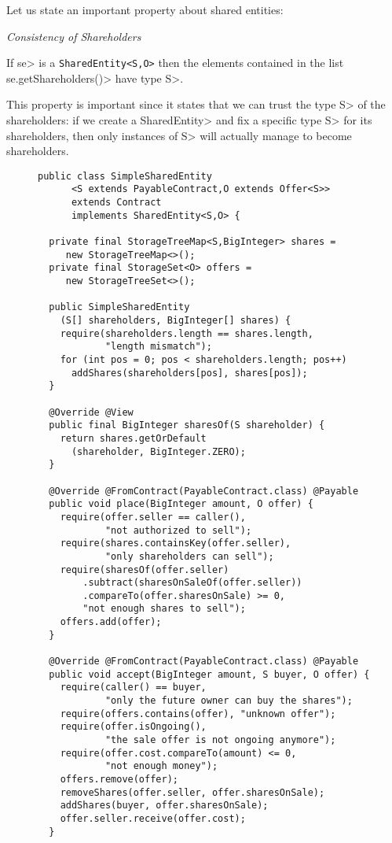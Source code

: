 Let us state an important property about shared entities:

\begin{tcolorbox}
  \begin{center}\emph{Consistency of Shareholders}\end{center}
  If \<se> is a {\codesize\texttt{SharedEntity<S,O>}}
  then the elements contained in the list \<se.getShareholders()> have type \<S>.
\end{tcolorbox}

\noindent
This property is important since it states that we can trust the type \<S> of
the shareholders: if we create a \<SharedEntity> and fix a specific type \<S>
for its shareholders, then only instances of \<S> will actually manage to become shareholders.

\begin{figure}[htbp]
  \begin{center}
    \begin{lstlisting}[language=Takamaka]
public class SimpleSharedEntity
      <S extends PayableContract,O extends Offer<S>>
      extends Contract
      implements SharedEntity<S,O> {

  private final StorageTreeMap<S,BigInteger> shares = 
     new StorageTreeMap<>();
  private final StorageSet<O> offers = 
     new StorageTreeSet<>();        

  public SimpleSharedEntity
    (S[] shareholders, BigInteger[] shares) {
    require(shareholders.length == shares.length, 
            "length mismatch");
    for (int pos = 0; pos < shareholders.length; pos++)
      addShares(shareholders[pos], shares[pos]);
  }

  @Override @View
  public final BigInteger sharesOf(S shareholder) {
    return shares.getOrDefault
      (shareholder, BigInteger.ZERO);
  }

  @Override @FromContract(PayableContract.class) @Payable
  public void place(BigInteger amount, O offer) {
    require(offer.seller == caller(), 
            "not authorized to sell");
    require(shares.containsKey(offer.seller), 
            "only shareholders can sell");
    require(sharesOf(offer.seller)
        .subtract(sharesOnSaleOf(offer.seller))
        .compareTo(offer.sharesOnSale) >= 0, 
        "not enough shares to sell");
    offers.add(offer);
  }

  @Override @FromContract(PayableContract.class) @Payable
  public void accept(BigInteger amount, S buyer, O offer) {
    require(caller() == buyer, 
            "only the future owner can buy the shares");
    require(offers.contains(offer), "unknown offer");
    require(offer.isOngoing(), 
            "the sale offer is not ongoing anymore");
    require(offer.cost.compareTo(amount) <= 0, 
            "not enough money");
    offers.remove(offer);
    removeShares(offer.seller, offer.sharesOnSale);
    addShares(buyer, offer.sharesOnSale);
    offer.seller.receive(offer.cost);
  }


\end{lstlisting}
\end{center}
\end{figure}
